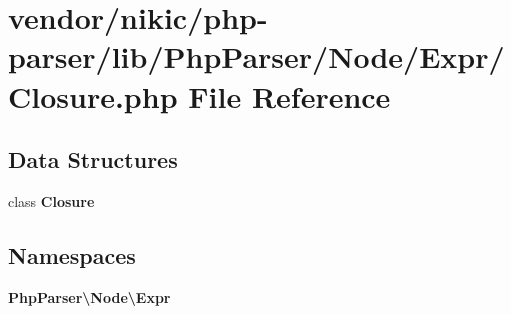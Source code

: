 \section{vendor/nikic/php-\/parser/lib/\+Php\+Parser/\+Node/\+Expr/\+Closure.php File Reference}
\label{nikic_2php-parser_2lib_2_php_parser_2_node_2_expr_2_closure_8php}
\subsection*{Data Structures}
\begin{DoxyCompactItemize}
\item 
class {\bf Closure}
\end{DoxyCompactItemize}
\subsection*{Namespaces}
\begin{DoxyCompactItemize}
\item 
 {\bf Php\+Parser\textbackslash{}\+Node\textbackslash{}\+Expr}
\end{DoxyCompactItemize}
